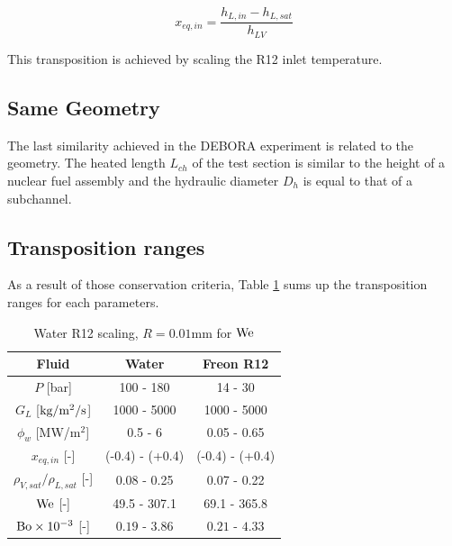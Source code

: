 \begin{equation}
x_{eq,in} = \frac{h_{L,in} - h_{L,sat}}{h_{LV}}
\end{equation}

\begin{note*}{}
This transposition is achieved by scaling the R12 inlet temperature.
\end{note*}

\subsection{Same Geometry}

The last similarity achieved in the DEBORA experiment is related to the geometry. The heated length $L_{ch}$ of the test section is similar to the height of a nuclear fuel assembly and the hydraulic diameter $D_{h}$ is equal to that of a subchannel.


\subsection{Transposition ranges}

As a result of those conservation criteria, Table \ref{tab:R12_PWR_transposition} sums up the transposition ranges for each parameters.



\begin{table}[!h]
\centering
\begin{tabular}{c||c|c} 

Fluid & Water & Freon R12 \\
\hline \hline
$P$ [bar] & 100 - 180 & 14 - 30\\
%
$G_{L}$ [$\text{kg/m$^{2}$/s}$] & 1000 - 5000 & 1000 - 5000\\
%
$\phi_{w}$ [MW/m$^{2}$] & 0.5 - 6 & 0.05 - 0.65\\ 
%
$x_{eq,in}$ [-] & (-0.4) - (+0.4) & (-0.4) - (+0.4)\\
\hline
\hline 
${\rho_{V,sat}}/{\rho_{L,sat}}$ [-] & 0.08 - 0.25 & 0.07 - 0.22\\
%
$\mathrm{We}$ [-] & 49.5 - 307.1 & 69.1 - 365.8\\
%
$\mathrm{Bo} \times 10^{-3} $ [-] &  $0.19$ - $3.86$ & $0.21$ - $4.33$ \\
\hline
\end{tabular}

\caption{Water R12 scaling, $R=0.01$mm for $\mathrm{We}$}
\label{tab:R12_PWR_transposition}

\end{table}



